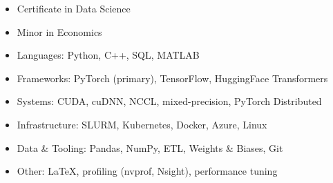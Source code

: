 
\begin{itemize}
    \item Certificate in Data Science
\end{itemize}
\begin{itemize}
    \item{Minor in Economics}
\end{itemize}


\begin{itemize}\footnotesize
    \item Languages: Python, C++, SQL, MATLAB
    \item Frameworks: PyTorch (primary), TensorFlow, HuggingFace Transformers
    \item Systems: CUDA, cuDNN, NCCL, mixed-precision, PyTorch Distributed
    \item Infrastructure: SLURM, Kubernetes, Docker, Azure, Linux
    \item Data \& Tooling: Pandas, NumPy, ETL, Weights \& Biases, Git
    \item Other: LaTeX, profiling (nvprof, Nsight), performance tuning
\end{itemize}

